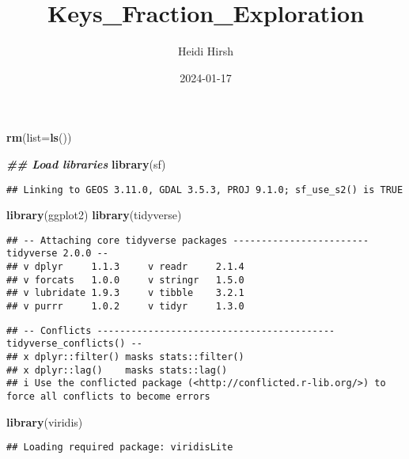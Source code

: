 \documentclass[
]{article}
\title{Keys\_Fraction\_Exploration}
\author{Heidi Hirsh}
\date{2024-01-17}
\newenvironment{Shaded}{\begin{snugshade}}{\end{snugshade}}
\newcommand{\AttributeTok}[1]{\textcolor[rgb]{0.13,0.29,0.53}{#1}}
\newcommand{\DocumentationTok}[1]{\textcolor[rgb]{0.56,0.35,0.01}{\textbf{\textit{#1}}}}
\newcommand{\FunctionTok}[1]{\textcolor[rgb]{0.13,0.29,0.53}{\textbf{#1}}}
\newcommand{\NormalTok}[1]{#1}
\begin{document}
\maketitle

\begin{Shaded}
\begin{Highlighting}[]
\FunctionTok{rm}\NormalTok{(}\AttributeTok{list=}\FunctionTok{ls}\NormalTok{())}

\DocumentationTok{\#\# Load libraries}
\FunctionTok{library}\NormalTok{(sf)}
\end{Highlighting}
\end{Shaded}

\begin{verbatim}
## Linking to GEOS 3.11.0, GDAL 3.5.3, PROJ 9.1.0; sf_use_s2() is TRUE
\end{verbatim}

\begin{Shaded}
\begin{Highlighting}[]
\FunctionTok{library}\NormalTok{(ggplot2)}
\FunctionTok{library}\NormalTok{(tidyverse)}
\end{Highlighting}
\end{Shaded}

\begin{verbatim}
## -- Attaching core tidyverse packages ------------------------ tidyverse 2.0.0 --
## v dplyr     1.1.3     v readr     2.1.4
## v forcats   1.0.0     v stringr   1.5.0
## v lubridate 1.9.3     v tibble    3.2.1
## v purrr     1.0.2     v tidyr     1.3.0
\end{verbatim}

\begin{verbatim}
## -- Conflicts ------------------------------------------ tidyverse_conflicts() --
## x dplyr::filter() masks stats::filter()
## x dplyr::lag()    masks stats::lag()
## i Use the conflicted package (<http://conflicted.r-lib.org/>) to force all conflicts to become errors
\end{verbatim}

\begin{Shaded}
\begin{Highlighting}[]
\FunctionTok{library}\NormalTok{(viridis)       }
\end{Highlighting}
\end{Shaded}

\begin{verbatim}
## Loading required package: viridisLite
\end{verbatim}
\end{document}
